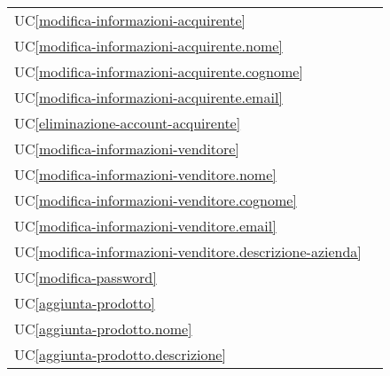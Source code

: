 \begin{longtable}{C{6cm} C{6cm}}
	UC\ref{modifica-informazioni-acquirente} &  \\

    UC\ref{modifica-informazioni-acquirente.nome} &  \\

	UC\ref{modifica-informazioni-acquirente.cognome} &  \\

    UC\ref{modifica-informazioni-acquirente.email} &  \\

    UC\ref{eliminazione-account-acquirente} &  \\

	UC\ref{modifica-informazioni-venditore} &  \\

    UC\ref{modifica-informazioni-venditore.nome} &  \\

    UC\ref{modifica-informazioni-venditore.cognome} &  \\

	UC\ref{modifica-informazioni-venditore.email} &  \\

	UC\ref{modifica-informazioni-venditore.descrizione-azienda} &  \\

    UC\ref{modifica-password} &  \\

    UC\ref{aggiunta-prodotto} &  \\

	UC\ref{aggiunta-prodotto.nome} &  \\

    UC\ref{aggiunta-prodotto.descrizione} &  \\


\end{longtable}
